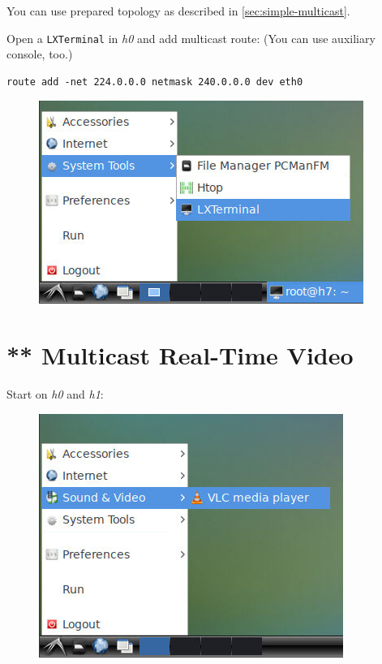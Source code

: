 \documentclass{../UTNetLab}
\begin{document}
You can use prepared topology as described in \autoref{sec:simple-multicast}.

Open a \texttt{LXTerminal} in \textit{h0} and add multicast route: (You can use auxiliary console, too.)

\begin{lstlisting}[emph={eth0}]
route add -net 224.0.0.0 netmask 240.0.0.0 dev eth0
\end{lstlisting}

\begin{figure}[H]
    \centering
    \includegraphics[scale=2.0]{img/terminal}
\end{figure}

\section{** Multicast Real-Time Video}
Start  on \textit{h0} and \textit{h1}:
\begin{figure}[H]
    \centering
    \includegraphics[scale=2.0]{img/vlc-open}
\end{figure}
\end{document}
